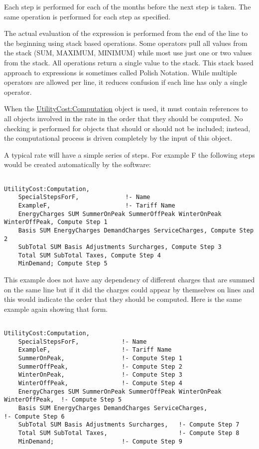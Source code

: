 Each step is performed for each of the months before the next step is taken. The same operation is performed for each step as specified.

The actual evaluation of the expression is performed from the end of the line to the beginning using stack based operations. Some operators pull all values from the stack (SUM, MAXIMUM, MINIMUM) while most use just one or two values from the stack. All operations return a single value to the stack. This stack based approach to expressions is sometimes called Polish Notation. While multiple operators are allowed per line, it reduces confusion if each line has only a single operator.

When the \hyperref[utilitycostcomputation]{UtilityCost:Computation} object is used, it must contain references to all objects involved in the rate in the order that they should be computed. No checking is performed for objects that should or should not be included; instead, the computational process is driven completely by the input of this object.

A typical rate will have a simple series of steps. For example F the following steps would be created automatically by the software:

\begin{lstlisting}

UtilityCost:Computation,
    SpecialStepsForF,             !- Name
    ExampleF,                     !- Tariff Name
    EnergyCharges SUM SummerOnPeak SummerOffPeak WinterOnPeak WinterOffPeak, Compute Step 1
    Basis SUM EnergyCharges DemandCharges ServiceCharges, Compute Step 2
    SubTotal SUM Basis Adjustments Surcharges, Compute Step 3
    Total SUM SubTotal Taxes, Compute Step 4
    MinDemand; Compute Step 5
\end{lstlisting}

This example does not have any dependency of different charges that are summed on the same line but if it did the charges could appear by themselves on lines and this would indicate the order that they should be computed. Here is the same example again showing that form.

\begin{lstlisting}

UtilityCost:Computation,
    SpecialStepsForF,            !- Name
    ExampleF,                    !- Tariff Name
    SummerOnPeak,                !- Compute Step 1
    SummerOffPeak,               !- Compute Step 2
    WinterOnPeak,                !- Compute Step 3
    WinterOffPeak,               !- Compute Step 4
    EnergyCharges SUM SummerOnPeak SummerOffPeak WinterOnPeak WinterOffPeak,  !- Compute Step 5
    Basis SUM EnergyCharges DemandCharges ServiceCharges,                     !- Compute Step 6
    SubTotal SUM Basis Adjustments Surcharges,   !- Compute Step 7
    Total SUM SubTotal Taxes,                    !- Compute Step 8
    MinDemand;                   !- Compute Step 9
\end{lstlisting}


